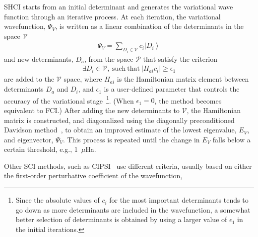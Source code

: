 \documentclass[%
preprint,
 superscriptaddress,
 amsmath,amssymb,
 aps,
]{revtex4-1}
\def\beq{\begin{eqnarray}}
\def\eeq{\end{eqnarray}}
\def\V{\mathcal{V}}
\def\P{\mathcal{P}}
\begin{document}
SHCI starts from an initial determinant
and generates the variational wave function through an iterative process.
At each iteration, the variational wavefunction, $\Psi_V$, is written as a linear combination of the determinants in the space $\V$
\begin{align}
\Psi_{V} = \sum_{D_{i} \in \V} c_{i} \left|D_{i}\right\rangle
\end{align}
and new determinants, ${D_a}$, from the space $\P$ that satisfy the criterion
\beq
\exists D_{i} \in \V , \mathrm{\ such\ that\ } \left|H_{a i} c_{i}\right| \ge \epsilon_{1}
\label{HCI_criterion}
\eeq
are added to the $\V$ space, where
$H_{ai}$ is the Hamiltonian matrix element between determinants $D_a$ and $D_i$, and
$\epsilon_1$ is a user-defined parameter that controls the accuracy of the variational
stage~\footnote{Since the absolute values of $c_i$ for the most important determinants tends to go down as more determinants are
included in the wavefunction, a somewhat better selection of determinants is obtained by using a larger value of
$\epsilon_1$ in the initial iterations.}.
(When $\epsilon_1=0$, the method becomes equivalent to FCI.)
After adding the new determinants to $\V$, the Hamiltonian matrix is constructed, and diagonalized using the diagonally
preconditioned Davidson method~\cite{Dav-CPC-89}, to obtain an improved estimate of the lowest eigenvalue, $E_{V}$, and eigenvector, $\Psi_V$.
This process is repeated until the change in $E_V$ falls below a certain threshold, e.g., 1~$\mu$Ha.

Other SCI methods, such as CIPSI~\cite{HurMalRan-JCP-73,EvaDauMal-CP-83} use different criteria, usually based on either the first-order perturbative
coefficient of the wavefunction,
\end{document}
